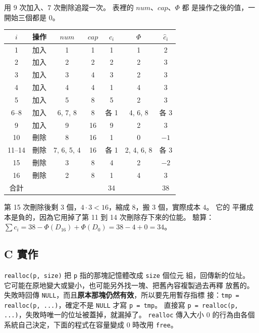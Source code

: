 用 $9$ 次加入、$7$ 次刪除追蹤一次。 表裡的 $\mathit{num}$、$\mathit{cap}$、$\Phi$ 都
是操作之後的值，一開始三個都是 $0$。

\begin{center}
\begin{tabular}{clccccc}
\toprule
$i$ & 操作 & $\mathit{num}$ & $\mathit{cap}$ & $c_i$ & $\Phi$ & $\hat{c}_i$ \\
\midrule
1 & 加入 & 1 & 1 & 1 & 1 & 2 \\
2 & 加入 & 2 & 2 & 2 & 2 & 3 \\
3 & 加入 & 3 & 4 & 3 & 2 & 3 \\
4 & 加入 & 4 & 4 & 1 & 4 & 3 \\
5 & 加入 & 5 & 8 & 5 & 2 & 3 \\
6--8 & 加入 & 6, 7, 8 & 8 & 各 1 & 4, 6, 8 & 各 3 \\
9 & 加入 & 9 & 16 & 9 & 2 & 3 \\
10 & 刪除 & 8 & 16 & 1 & 0 & $-1$ \\
11--14 & 刪除 & 7, 6, 5, 4 & 16 & 各 1 & 2, 4, 6, 8 & 各 3 \\
15 & 刪除 & 3 & 8 & 4 & 2 & $-2$ \\
16 & 刪除 & 2 & 8 & 1 & 4 & 3 \\
\midrule
合計 & & & & 34 & & 38 \\
\bottomrule
\end{tabular}
\end{center}

第 15 次刪除後剩 $3$ 個，$4 \cdot 3 < 16$，縮成 $8$，搬 $3$ 個，實際成本 $4$。 它的
平攤成本是負的，因為它用掉了第 11 到 14 次刪除存下來的位能。 驗算：
$\sum c_i = 38 - \Phi(D_{16}) + \Phi(D_0) = 38 - 4 + 0 = 34$。

\subsection{C 實作}

\begin{cbookrecap}[第~19~章 19.3 節]
\texttt{realloc(p, size)} 把 \texttt{p} 指的那塊記憶體改成 \texttt{size} 個位元
組，回傳新的位址。 它可能在原地變大或變小，也可能另外找一塊、把舊內容複製過去再釋
放舊的。 失敗時回傳 \texttt{NULL}，而且\textbf{原本那塊仍然有效}，所以要先用暫存指標
接：\texttt{tmp = realloc(p, ...)}，確定不是 \texttt{NULL} 才寫 \texttt{p = tmp}。
直接寫 \texttt{p = realloc(p, ...)}，失敗時唯一的位址被蓋掉，就漏掉了。
\texttt{realloc} 傳入大小 $0$ 的行為由各個系統自己決定，下面的程式在容量變成 $0$
時改用 \texttt{free}。
\end{cbookrecap}


